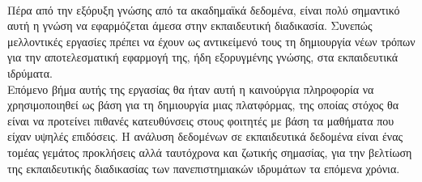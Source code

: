 \documentclass[12pt,a4paper,final]{article}
\begin{document}
\paragraph{}
Πέρα από την εξόρυξη γνώσης από τα ακαδημαϊκά δεδομένα, είναι πολύ σημαντικό αυτή η γνώση να εφαρμόζεται άμεσα στην εκπαιδευτική διαδικασία. Συνεπώς μελλοντικές  εργασίες πρέπει να έχουν ως αντικείμενό τους τη δημιουργία νέων τρόπων για την αποτελεσματική εφαρμογή της, ήδη εξορυγμένης γνώσης, στα εκπαιδευτικά ιδρύματα.\\
Επόμενο βήμα αυτής της εργασίας θα ήταν αυτή η καινούργια πληροφορία να χρησιμοποιηθεί ως βάση για τη δημιουργία μιας  πλατφόρμας, της οποίας στόχος θα είναι να προτείνει πιθανές κατευθύνσεις στους φοιτητές με βάση τα μαθήματα που είχαν υψηλές  επιδόσεις.  
Η ανάλυση δεδομένων σε εκπαιδευτικά δεδομένα είναι ένας τομέας γεμάτος προκλήσεις αλλά ταυτόχρονα και ζωτικής σημασίας, για την βελτίωση  της εκπαιδευτικής διαδικασίας των πανεπιστημιακών ιδρυμάτων τα επόμενα χρόνια. 

\clearpage
\end{document}
